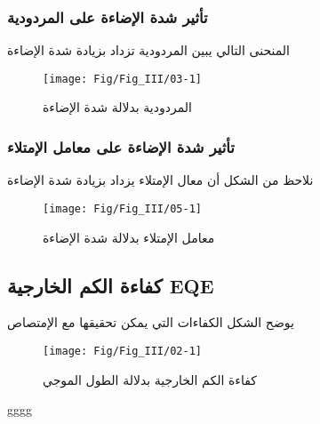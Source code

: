 \FloatBarrier
 \subsubsection{ تأثير شدة الإضاءة  على  المردودية}
 المنحنى التالي  يبين  المردودية تزداد بزيادة شدة الإضاءة 
 \begin{figure}[h!]
 	\centering
 	\texttt{[image: Fig/Fig\_III/03-1]}
 	\caption{المردودية بدلالة  شدة الإضاءة}
 	\label{fig:03-1}
 \end{figure}
 \FloatBarrier
\subsubsection{ تأثير   شدة الإضاءة على   معامل الإمتلاء}
نلاحظ من الشكل أن معال الإمتلاء يزداد بزيادة شدة الإضاءة 
\begin{figure}[h!]
	\centering
	\texttt{[image: Fig/Fig\_III/05-1]}
	\caption{معامل الإمتلاء بدلالة شدة الإضاءة}
	\label{fig:05-1}
\end{figure}
\FloatBarrier
\subsection{ كفاءة الكم الخارجية EQE }
يوضح الشكل الكفاءات التي يمكن تحقيقها مع الإمتصاص 
\begin{figure}[h!]
	\centering
	\texttt{[image: Fig/Fig\_III/02-1]}
	\caption{كفاءة الكم الخارجية بدلالة الطول الموجي}
	\label{fig:02-1}
\end{figure}
\FloatBarrier
 gggg